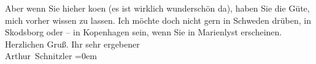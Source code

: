\begin{ledgroupsized}[t]{13cm}
               Aber wenn Sie hieher ko{\geminationm}en (es ist wirklich wunderschön
               da), haben Sie die Güte, mich vorher wissen zu lassen. Ich möchte doch nicht gern in
                  Schweden drüben, in Skodsborg oder – in Kopenhagen sein, wenn Sie in Marienlyst
               erscheinen.\pend
           \pstart
           Herzlichen Gruß. Ihr sehr ergebener{\\[\baselineskip]}\spacefill\mbox{Arthur Schnitzler}\pend
           \leftskip=0em{}
         
         \endnumbering{}\end{ledgroupsized}  \newcommand{\dateiname}{L01610}\newcommand{\titel}{Arthur Schnitzler an Georg Brandes, 13. 7. 1906}\newcommand{\editorInnen}{Martin Anton Müller und Gerd-Hermann Susen}
      